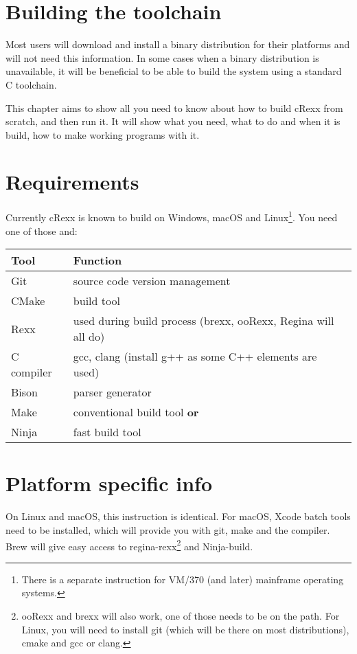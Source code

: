 \hypertarget{building-the-toolchain}{%
\section{\texorpdfstring{Building the \crexx{}
toolchain}{Building the  toolchain}}\label{building-the-toolchain}}

Most users will download and install a binary distribution for
their platforms and will not need this information. In some cases
when a binary distribution is unavailable, it will be beneficial to be
able to build the \crexx{} system using a standard C toolchain.

This chapter aims to show all you need to know about how to build
cRexx from scratch, and then run it. It will show what you need, what to
do and when it is build, how to make working programs with it.

\hypertarget{requirements}{%
\section{Requirements}\label{requirements}}

Currently cRexx is known to build on Windows, macOS and
Linux\footnote{There is a separate instruction for VM/370 (and later)
  mainframe operating systems.}. You need one of those and:

\begin{longtable}[]{@{}ll@{}}
\toprule()
Tool & Function \\
\midrule()
\endhead
Git & source code version management \\
CMake & build tool \\
Rexx & used during build process (brexx, ooRexx, Regina will all do) \\
C compiler & gcc, clang (install g++ as some C++ elements are used) \\
Bison & parser generator \\
Make & conventional build tool \textbf{or} \\
Ninja & fast build tool \\
\bottomrule()
\end{longtable}

\hypertarget{platform-specific-info}{%
\section{Platform specific info}\label{platform-specific-info}}

On Linux and macOS, this instruction is identical. For macOS, Xcode
batch tools need to be installed, which will provide you with git, make
and the compiler. Brew will give easy access to regina-rexx\footnote{ooRexx
  and brexx will also work, one of those needs to be on the path. For
  Linux, you will need to install git (which will be there on most
  distributions), cmake and gcc or clang.} and Ninja-build.

